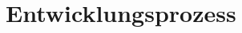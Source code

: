 \documentclass[a4paper,titlepage,12pt,ngerman]{scrbook}
\begin{document}

\tableofcontents



\chapter{Entwicklungsprozess}



%
%



%

%

%
\end{document}
